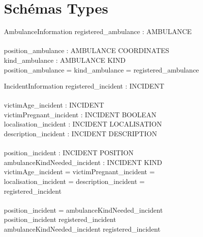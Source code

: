 \documentclass[12pt]{article}
\begin{document}
\section{Schémas Types}
\begin{schema}{AmbulanceInformation}
 	registered\_ambulance : \power AMBULANCE \\
	\newline \\
 	position\_ambulance : AMBULANCE \pinj COORDINATES \\
 	kind\_ambulance : AMBULANCE \pfun KIND \\
  \where
  	\dom position\_ambulance = \dom kind\_ambulance = registered\_ambulance
\end{schema}

\begin{schema}{IncidentInformation}
	registered\_incident : \power INCIDENT \\
	\newline \\
	victimAge\_incident : INCIDENT \pfun \nat \\ %
	victimPregnant\_incident : INCIDENT \pfun BOOLEAN \\
	localisation\_incident : INCIDENT \pfun LOCALISATION \\
	description\_incident : INCIDENT \pfun DESCRIPTION \\
	\newline \\
	position\_incident : INCIDENT \pfun POSITION \\
	ambulanceKindNeeded\_incident : INCIDENT \pfun KIND \\
  \where
  	\dom victimAge\_incident = \dom victimPregnant\_incident =\\
	 \dom localisation\_incident = \dom description\_incident =\\
	 registered\_incident \\
	 \newline \\
	 \dom position\_incident = \dom ambulanceKindNeeded\_incident \\
	 \dom position\_incident \subseteq registered\_incident \\
	 \dom ambulanceKindNeeded\_incident  \subseteq registered\_incident \\ %
\end{schema}
\end{document}
